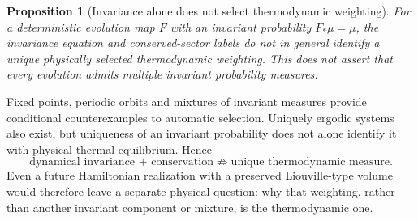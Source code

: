 \documentclass[11pt]{article}
\newtheorem{proposition}[theorem]{Proposition}
\theoremstyle{definition}
\begin{document}
\begin{proposition}[Invariance alone does not select thermodynamic weighting]
\label{prop:invariant-measure-no-go}
For a deterministic evolution map $F$ with an invariant probability
$F_*\mu=\mu$, the invariance equation and conserved-sector labels do not
\emph{in general} identify a unique physically selected thermodynamic
weighting. This does not assert that every evolution admits multiple invariant
probability measures.
\end{proposition}
Fixed points, periodic orbits and mixtures of invariant measures provide
conditional counterexamples to automatic selection.  Uniquely ergodic systems
also exist, but uniqueness of an invariant probability does not alone identify
it with physical thermal equilibrium.  Hence
\begin{equation}
  \boxed{
  \text{dynamical invariance + conservation}
  \not\Rightarrow
  \text{unique thermodynamic measure}.}
  \label{eq:invariant-measure-no-go}
\end{equation}
Even a future Hamiltonian realization with a preserved Liouville-type volume would therefore
leave a separate physical question: why that weighting, rather than another invariant
component or mixture, is the thermodynamic one.
\end{document}
